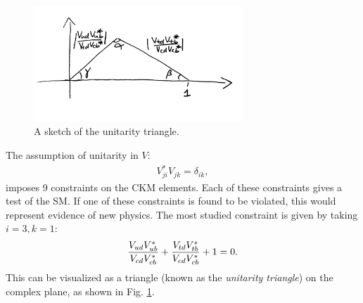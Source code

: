 
\begin{figure}
  \vspace{-10pt}
  \begin{center}
    \includegraphics[width=0.7\textwidth]{images/unitaritytriangle_sketch.jpg}
  \end{center}
  \vspace{-40pt}
  \caption{A sketch of the unitarity triangle.}
  \label{fig:unitaritytriangle_sketch}
\end{figure}

The assumption of unitarity in $V$:
\begin{align}
  V_{ji}^*V_{jk}=\delta_{ik},
  \label{eq:CKMunitarity}
\end{align}
imposes 9 constraints on the CKM elements. Each of these constraints gives a test of the SM. If one of these constraints is found to be violated, this would represent evidence of new physics. The most studied constraint is given by taking $i=3,k=1$:
\begin{align}
  {V_{ud}V_{ub}^*\over V_{cd} V_{cb}^*} + {V_{td}V_{tb}^* \over V_{cd}V_{cb}^*} + 1 = 0.
\end{align}
This can be visualized as a triangle (known as the {\it{unitarity triangle}}) on the complex plane, as shown in Fig. \ref{fig:unitaritytriangle_sketch}.


